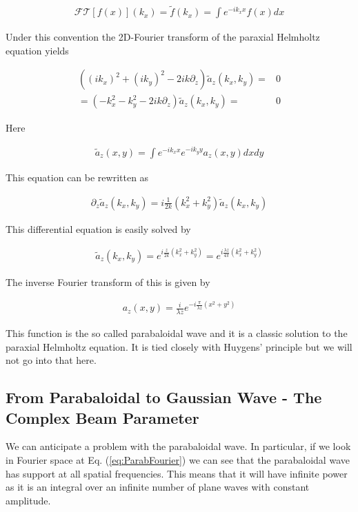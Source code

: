\documentclass[12pt]{article}
\begin{document}
\begin{align}
\mathcal{FT}[f(x)](k_x) = \tilde{f}(k_x) = \int e^{-ik_x x} f(x) dx
\end{align}

Under this convention the 2D-Fourier transform of the paraxial Helmholtz equation yields

\begin{align}
\left((ik_x)^2 + (ik_y)^2 - 2ik \partial_z\right)\tilde{a}_z(k_x,k_y) =& 0\\
= (-k_x^2 - k_y^2 - 2ik\partial_z)\tilde{a}_z(k_x,k_y) =& 0
\end{align}

Here

\begin{align}
\tilde{a}_z(x,y) = \int e^{-ik_x x}e^{-ik_y y} a_z(x,y) dx dy
\end{align}

This equation can be rewritten as

\begin{align}
\label{eq:ParaxHelmFourier}
\partial_z \tilde{a}_z(k_x, k_y) = i \frac{1}{2k}(k_x^2 + k_y^2) \tilde{a}_z(k_x, k_y)
\end{align}

This differential equation is easily solved by

\begin{align}
\label{eq:ParabFourier}
\tilde{a}_z(k_x, k_y) = e^{i\frac{z}{2k}(k_x^2 + k_y^2)} = e^{i\frac{\lambda z}{4\pi} (k_x^2 + k_y^2)}
\end{align}

The inverse Fourier transform of this is given by

\begin{align}
a_z(x, y) = \frac{i}{\lambda z} e^{-i\frac{\pi}{\lambda z}(x^2 + y^2)}
\end{align}

This function is the so called parabaloidal wave and it is a classic solution to the paraxial Helmholtz equation.
It is tied closely with Huygens' principle but we will not go into that here.

\subsection{From Parabaloidal to Gaussian Wave - The Complex Beam Parameter}

We can anticipate a problem with the parabaloidal wave. In particular, if we look in Fourier space at Eq. (\ref{eq:ParabFourier}) we can see that the parabaloidal wave has support at all spatial frequencies.
This means that it will have infinite power as it is an integral over an infinite number of plane waves with constant amplitude.
\end{document}
